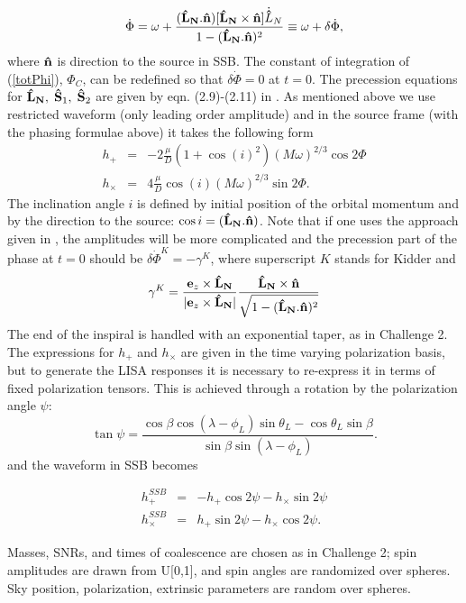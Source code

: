 \documentclass{iopart}
\def\bL{{\bf \hat{L}_{N}}}
\def\hn{{\bf {\hat n}}}
\begin{document}
\begin{equation}
\dot{\Phi} = \omega + \frac{(\bL.\hn)[\bL\times \hn]\dot{\bf \hat{L}}_N}{1-(\bL.\hn)^2}
\equiv \omega + \delta\dot{\Phi},\label{totPhi}
\end{equation}
where $\hn$ is direction to the source in SSB. The constant of integration of (\ref{totPhi}),
 $\Phi_C$,  can be redefined so that $\delta\dot{\Phi} = 0$ at $t=0$.  The precession  
 equations for $\bL, \; {\bf \hat{S}}_1,\;{\bf \hat{S}}_2$ are given by eqn. (2.9)-(2.11) in 
 \cite{LangHughes}. As mentioned above we use restricted waveform (only leading order amplitude) and in the source frame (with the phasing formulae above) it takes the following form 
 \begin{eqnarray}
h_{+} &=& -2\frac{\mu}{D}(1 + \cos(i)^2)(M\omega)^{2/3}\cos{2\Phi}\\
h_{\times} &=& 4\frac{\mu}{D}\cos(i)(M\omega)^{2/3}\sin{2\Phi}.
\end{eqnarray}
The inclination angle $i$ is defined by initial position of the orbital momentum and 
by the direction to the source: $\cos{i} = (\bL.\hn)$.
Note that if one uses the approach given in \cite{Kidder}, the amplitudes will be more complicated
and the precession part of the phase at $t=0$ should be $\delta\dot{\Phi}^K = -\gamma^K$,
where superscript $K$ stands for Kidder and 
$$
\gamma^K = \frac{{\bf e}_z \times \bL}{|{\bf e}_z \times \bL|}\frac{\bL\times \hn}
{\sqrt{1 - (\bL.\hn)^2}}
$$
The end of the inspiral is handled with an exponential taper, as in Challenge 2. The expressions 
for $h_{+}$ and $h_{\times}$ are given in the time varying polarization basis, but to generate the LISA responses it is necessary to re-express it in terms
of fixed polarization tensors. This is achieved through a rotation by the polarization
angle $\psi$:
\begin{equation}
\tan{\psi} = \frac{\cos{\beta}\cos{(\lambda -\phi_L)}\sin{\theta_L} - \cos{\theta_L}\sin{\beta}}
{\sin{\beta}\sin{(\lambda - \phi_L)}}.
\end{equation}
and the waveform in SSB becomes

\begin{eqnarray}
h_{+}^{SSB} &=& -h_{+}\cos{2\psi} - h_{\times}\sin{2\psi}\\
h_{\times}^{SSB} &=& h_{+}\sin{2\psi} - h_{\times}\cos{2\psi}.
\end{eqnarray}





Masses, SNRs, and times of coalescence
are chosen as in Challenge 2; spin amplitudes are drawn from U[0,1], and spin angles are randomized over spheres.
Sky position, polarization, extrinsic parameters are random over spheres.
\end{document}
